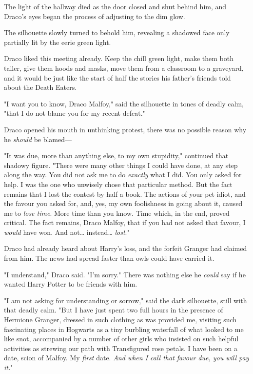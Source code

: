 The light of the hallway died as the door closed and shut behind him, and
Draco's eyes began the process of adjusting to the dim glow.

The silhouette slowly turned to behold him, revealing a shadowed face only
partially lit by the eerie green light.

Draco liked this meeting already. Keep the chill green light, make them both
taller, give them hoods and masks, move them from a classroom to a graveyard,
and it would be just like the start of half the stories his father's friends
told about the Death Eaters.

"I want you to know, Draco Malfoy," said the silhouette in tones of deadly
calm, "that I do not blame you for my recent defeat."

Draco opened his mouth in unthinking protest, there was no possible reason why
he \emph{should} be blamed---

"It was due, more than anything else, to my own stupidity," continued that
shadowy figure. "There were many other things I could have done, at any step
along the way. You did not ask me to do \emph{exactly} what I did. You only
asked for help. I was the one who unwisely chose that particular method. But
the fact remains that I lost the contest by half a book. The actions of your
pet idiot, and the favour you asked for, and, yes, my own foolishness in going
about it, caused me to \emph{lose time}. More time than you know. Time which,
in the end, proved critical. The fact remains, Draco Malfoy, that if you had
not asked that favour, I \emph{would} have won. And not{\ldots} instead{\ldots}
\emph{lost}."

Draco had already heard about Harry's loss, and the forfeit Granger had claimed
from him. The news had spread faster than owls could have carried it.

"I understand," Draco said. "I'm sorry." There was nothing else he \emph{could}
say if he wanted Harry Potter to be friends with him.

"I am not asking for understanding or sorrow," said the dark silhouette, still
with that deadly calm. "But I have just spent two full hours in the presence of
Hermione Granger, dressed in such clothing as was provided me, visiting such
fascinating places in Hogwarts as a tiny burbling waterfall of what looked to
me like snot, accompanied by a number of other girls who insisted on such
helpful activities as strewing our path with Transfigured rose petals. I have
been on a date, scion of Malfoy. My \emph{first} date. \emph{And when I call
that favour due, you will pay it.}"

